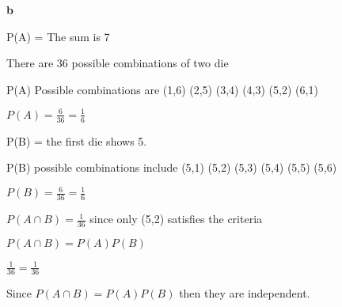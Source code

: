 \documentclass[12pt, letterpaper]{article}
\begin{document}
\textbf{b}

P(A) = The sum is 7

There are 36 possible combinations of two die

P(A) Possible combinations are (1,6) (2,5) (3,4) (4,3) (5,2) (6,1)

$P(A) = \frac{6}{36} = \frac{1}{6}$

P(B) = the first die shows 5.

P(B) possible combinations include (5,1) (5,2) (5,3) (5,4) (5,5) (5,6)

$P(B) = \frac{6}{36} = \frac{1}{6}$

$P(A \cap B) = \frac{1}{36}$ since only (5,2) satisfies the criteria

$P(A \cap B) = P(A)P(B)$

$\frac{1}{36} = \frac{1}{36}$

Since $P(A \cap B) = P(A)P(B)$ then they are independent.
\end{document}

